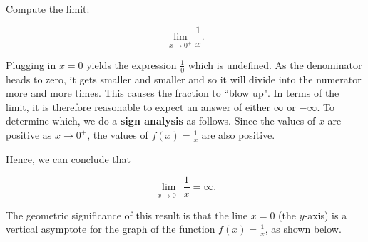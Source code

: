 \documentclass{ximera}
\begin{document}
\begin{example}[example 1]
Compute the limit: 

\[
\lim_{x \to 0^+} \frac{1}{x}.
\]

Plugging in $x=0$ yields the  expression $\frac{1}{0}$ which is undefined. 
As the denominator heads to zero, it gets smaller and smaller and so it will divide into the numerator 
more and more times.  This causes the fraction to ``blow up". In terms of the limit, it is therefore 
reasonable to expect an answer of either $\infty$ or $-\infty$.  
To determine which, we do a \textbf{sign analysis} as follows.
Since the values of $x$ are positive as $x \to 0^+$, the values of $f(x) = \frac{1}{x}$ are also positive.

Hence, we can conclude that 

\[\lim_{x \to 0^+} \frac{1}{x} =  \infty. \]

The geometric significance of this result is that the line $x=0$ (the $y$-axis) 
is a vertical asymptote for the graph of the function $f(x) = \frac{1}{x}$, as shown below.



\begin{center}
\end{center}
\end{example}
\end{document}
